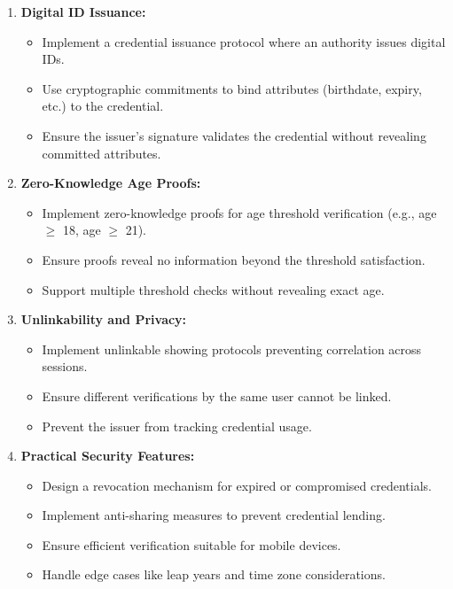 \documentclass[10pt,a4paper,american]{exam}
\begin{document}
\begin{enumerate}
	\item \textbf{Digital ID Issuance:}
	      \begin{itemize}
		      \item Implement a credential issuance protocol where an authority issues digital IDs.
		      \item Use cryptographic commitments to bind attributes (birthdate, expiry, etc.) to the credential.
		      \item Ensure the issuer's signature validates the credential without revealing committed attributes.
	      \end{itemize}

	\item \textbf{Zero-Knowledge Age Proofs:}
	      \begin{itemize}
		      \item Implement zero-knowledge proofs for age threshold verification (e.g., age $\geq$ 18, age $\geq$ 21).
		      \item Ensure proofs reveal no information beyond the threshold satisfaction.
		      \item Support multiple threshold checks without revealing exact age.
	      \end{itemize}

	\item \textbf{Unlinkability and Privacy:}
	      \begin{itemize}
		      \item Implement unlinkable showing protocols preventing correlation across sessions.
		      \item Ensure different verifications by the same user cannot be linked.
		      \item Prevent the issuer from tracking credential usage.
	      \end{itemize}

	\item \textbf{Practical Security Features:}
	      \begin{itemize}
		      \item Design a revocation mechanism for expired or compromised credentials.
		      \item Implement anti-sharing measures to prevent credential lending.
		      \item Ensure efficient verification suitable for mobile devices.
		      \item Handle edge cases like leap years and time zone considerations.
	      \end{itemize}
\end{enumerate}
\end{document}
